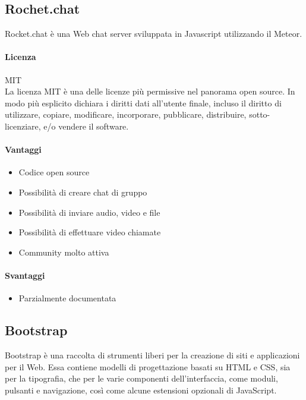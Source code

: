 \subsection{Rochet.chat}

Rocket.chat è una Web chat server sviluppata in Javascript utilizzando il  Meteor.

\paragraph{Licenza} MIT \\
La licenza MIT è una delle licenze più permissive nel panorama open
source. In modo più esplicito dichiara i diritti dati all'utente
finale, incluso il diritto di utilizzare, copiare, modificare,
incorporare, pubblicare, distribuire, sotto-licenziare, e/o vendere il
software. \\

\paragraph{Vantaggi}
\begin{itemize}

	\item Codice open source
	\item Possibilità di creare chat di gruppo
	\item Possibilità di inviare audio, video e file
	\item Possibilità di effettuare video chiamate
	\item Community molto attiva

	
\end{itemize}

\paragraph{Svantaggi} 
\begin{itemize}
	\item Parzialmente documentata
\end{itemize}

\subsection{Bootstrap}

Bootstrap è una raccolta di strumenti liberi per la creazione di siti
e applicazioni per il Web. Essa contiene modelli di progettazione
basati su HTML e CSS, sia per la tipografia, che per le varie
componenti dell'interfaccia, come moduli, pulsanti e navigazione, così
come alcune estensioni opzionali di JavaScript. \\

